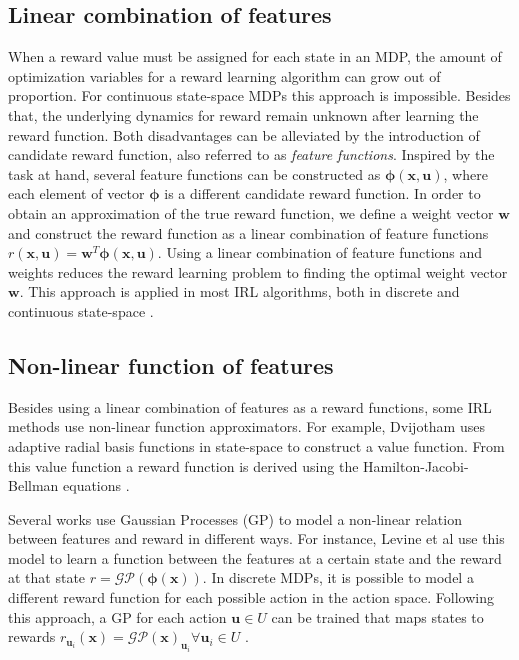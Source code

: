 \documentclass[mscThesis.tex]{subfiles}
\begin{document}
\subsection{Linear combination of features}
When a reward value must be assigned for each state in an MDP, the amount of optimization variables for a reward learning algorithm can grow out of proportion. For continuous state-space MDPs this approach is impossible. Besides that, the underlying dynamics for reward remain unknown after learning the reward function. Both disadvantages can be alleviated by the introduction of candidate reward function, also referred to as \emph{feature functions}. Inspired by the task at hand, several feature functions can be constructed as $\bm{\phi} ( \bm{x}, \bm{u} )$, where each element of vector $\bm{\phi}$ is a different candidate reward function. In order to obtain an approximation of the true reward function, we define a weight vector $\bm{w}$ and construct the reward function as a linear combination of feature functions $r(\bm{x}, \bm{u}) = \bm{w}^T \bm{\phi} ( \bm{x}, \bm{u} )$. Using a linear combination of feature functions and weights reduces the reward learning problem to finding the optimal weight vector $\bm{w}$.  This approach is applied in most IRL algorithms, both in discrete and continuous state-space \cite{zhifei2012review}.

\subsection{Non-linear function of features}
Besides using a linear combination of features as a reward functions, some IRL methods use non-linear function approximators. For example, Dvijotham uses adaptive radial basis functions in state-space to construct a value function. From this value function a reward function is derived using the Hamilton-Jacobi-Bellman equations \cite{dvijotham2010inverse}. 

Several works use Gaussian Processes (GP) to model a non-linear relation between features and reward in different ways. For instance, Levine et al \cite{Levine2011} use this model to learn a function between the features at a certain state and the reward at that state $r = \mathcal{GP}(\bm{\phi}(\bm{x}))$. In discrete MDPs, it is possible to model a different reward function for each possible action in the action space. Following this approach, a GP for each action $\bm{u} \in U$ can be trained that maps states to rewards $r_{\bm{u}_i}(\bm{x}) = \mathcal{GP}(\bm{x})_{\bm{u}_i} \forall \bm{u}_i \in U$ \cite{qiao2011inverse}. 
\end{document}
